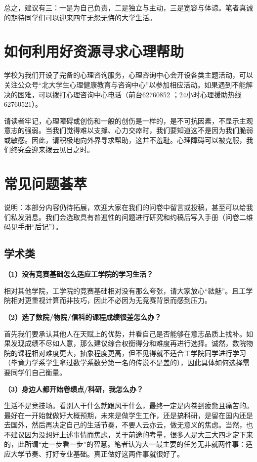 \documentclass[11pt,oneside]{book}
\begin{document}
总之，建议有三：一是为自己负责，二是独立与主动，三是宽容与体谅。笔者真诚的期待同学们可以迎来四年无怨无悔的大学生活。

\section{如何利用好资源寻求心理帮助}
学校为我们开设了完备的心理咨询服务，心理咨询中心会开设各类主题活动，可以关注公众号“北大学生心理健康教育与咨询中心”以参加相应活动。如果遇到不能解决的困难，可以拨打心理咨询中心电话（前台62760852 ；24小时心理援助热线62760521）。

请读者牢记，心理障碍或创伤和一般的创伤是一样的，是不可抗因素，不显示主观意志的强弱。当我们觉得难以支撑、心力交瘁时，我们要知道这不是因为我们脆弱或敏感。因此，请积极地向外界寻求帮助，这并不羞耻。心理障碍可以被克服，我们终究会迎来拨云见日之时。

\section{常见问题荟萃}
说明：本部分内容仍待拓展，欢迎大家在我们的问卷中留言或投稿，甚至可以给我们私发消息。我们会选取具有普遍性的问题进行研究和约稿后写入手册（问卷二维码见手册“后记”）。
\subsection{学术类}
\textbf{（1）没有竞赛基础怎么适应工学院的学习生活？}

相对其他学院，工学院的竞赛基础相对没有那么夸张，请大家放心“祛魅”。且工学院相对更重视计算而非技巧，因此不必因为无竞赛背景而感到压力。

\textbf{（2）选了数院/物院/信科的课程成绩很差怎么办？}

首先我们要承认其他人在天赋上的优势，并看自己是否能够在意志品质上找补。如果发现成绩不尽如人意，那么建议综合权衡得分和难度再进行选择。诚然，数院物院的课程相对难度更大，抽象程度更高，但不见得就不适合工学院同学进行学习（毕竟力学系学生拿过数学系数分第一名的传说不是盖的），因此具体如何选择需要同学们自己衡量。

\textbf{（3）身边人都开始卷绩点/科研，我怎么办？}

生活不是竞技场。看别人干什么就跟风干什么，最终一定是内卷到疲惫且痛苦的。最好在一开始就做好大概预期，未来是做学生工作，还是搞科研，是留在国内还是去国外，然后再决定自己的生活节奏，不要人云亦云，做无意义的焦虑。当然，也不建议因为没想好上述事情而焦虑，关于前途的考量，很多人是大三大四才定下来的，此所谓“走一步看一步”的智慧。笔者认为大一最主要的任务无非就两件事：适应大学节奏、打好专业基础。真正做好这两件事就很好了。
\end{document}
